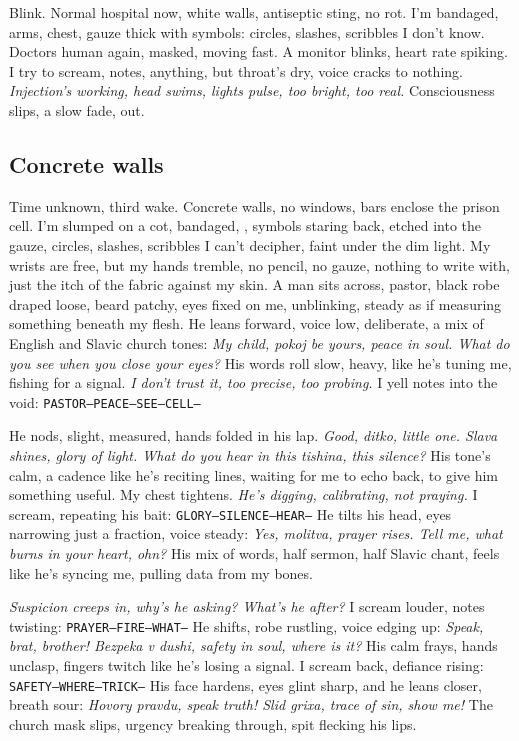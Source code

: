 \documentclass[12pt,oneside]{book} %
\newcommand{\note}[1]{\texttt{#1}}
\begin{document}
Blink. Normal hospital now, white walls, antiseptic sting, no rot. I’m bandaged, arms, chest, gauze thick with symbols: circles, slashes, scribbles I don’t know. Doctors human again, masked, moving fast. A monitor blinks, heart rate spiking. I try to scream, notes, anything, but throat’s dry, voice cracks to nothing. \textit{Injection’s working, head swims, lights pulse, too bright, too real.} Consciousness slips, a slow fade, out.

\subsection*{Concrete walls}
Time unknown, third wake. Concrete walls, no windows, bars enclose the prison cell. I’m slumped on a cot, bandaged, , symbols staring back, etched into the gauze, circles, slashes, scribbles I can’t decipher, faint under the dim light. My wrists are free, but my hands tremble, no pencil, no gauze, nothing to write with, just the itch of the fabric against my skin. A man sits across, pastor, black robe draped loose, beard patchy, eyes fixed on me, unblinking, steady as if measuring something beneath my flesh. He leans forward, voice low, deliberate, a mix of English and Slavic church tones: \textit{My child, pokoj be yours, peace in soul. What do you see when you close your eyes?} His words roll slow, heavy, like he’s tuning me, fishing for a signal. \textit{I don’t trust it, too precise, too probing.} I yell notes into the void: \note{PASTOR—PEACE—SEE—CELL—}

He nods, slight, measured, hands folded in his lap. \textit{Good, ditko, little one. Slava shines, glory of light. What do you hear in this tishina, this silence?} His tone’s calm, a cadence like he’s reciting lines, waiting for me to echo back, to give him something useful. My chest tightens. \textit{He’s digging, calibrating, not praying.} I scream, repeating his bait: \note{GLORY—SILENCE—HEAR—} He tilts his head, eyes narrowing just a fraction, voice steady: \textit{Yes, molitva, prayer rises. Tell me, what burns in your heart, ohn?} His mix of words, half sermon, half Slavic chant, feels like he’s syncing me, pulling data from my bones.

\textit{Suspicion creeps in, why’s he asking? What’s he after?} I scream louder, notes twisting: \note{PRAYER—FIRE—WHAT—} He shifts, robe rustling, voice edging up: \textit{Speak, brat, brother! Bezpeka v dushi, safety in soul, where is it?} His calm frays, hands unclasp, fingers twitch like he’s losing a signal. I scream back, defiance rising: \note{SAFETY—WHERE—TRICK—} His face hardens, eyes glint sharp, and he leans closer, breath sour: \textit{Hovory pravdu, speak truth! Slid grixa, trace of sin, show me!} The church mask slips, urgency breaking through, spit flecking his lips.
\end{document}
